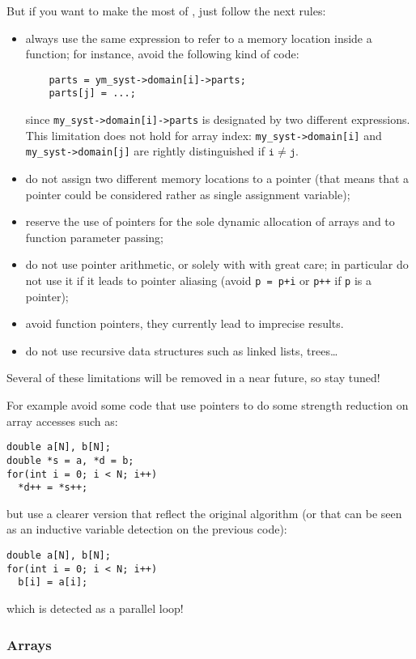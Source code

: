 \documentclass[a4paper]{article}
\begin{document}
But if you want to make the most of \Apfa, just follow the next rules:
\begin{itemize}
\item always use the same expression to refer to a memory location
  inside a function; for instance, avoid the following kind of code:
  \begin{lstlisting}
    parts = ym_syst->domain[i]->parts;
    parts[j] = ...;
  \end{lstlisting}
  since \lstinline|my_syst->domain[i]->parts| is designated by two
  different expressions. This limitation does not hold for array
  index: \lstinline|my_syst->domain[i]| and
  \lstinline|my_syst->domain[j]| are rightly distinguished if
  $\mathtt{i} \neq \mathtt{j}$.
\item do not assign two different memory locations to a pointer (that
  means that a pointer could be considered rather as single assignment
  variable);
\item reserve the use of pointers for the sole dynamic allocation of
  arrays and to function parameter passing;
\item do not use pointer arithmetic, or solely with with great care;
  in particular do not use it if it leads to pointer aliasing (avoid
  \texttt{p = p+i} or \texttt{p++} if \texttt{p} is a pointer);
\item avoid function pointers, they currently lead to imprecise results.
\item do not use recursive data structures such as linked lists, trees\ldots
\end{itemize}
Several of these limitations will be removed in a near future, so stay tuned!

For example avoid some code that use pointers to do some strength
reduction on array accesses such as:
\begin{lstlisting}
double a[N], b[N];
double *s = a, *d = b;
for(int i = 0; i < N; i++)
  *d++ = *s++;
\end{lstlisting}
but use a clearer version that reflect the original algorithm (or that can
be seen as an inductive variable detection on the previous code):
\begin{lstlisting}
double a[N], b[N];
for(int i = 0; i < N; i++)
  b[i] = a[i];
\end{lstlisting}
which is detected as a parallel loop!

\subsubsection{Arrays}
\label{sec:arrays}
\end{document}

